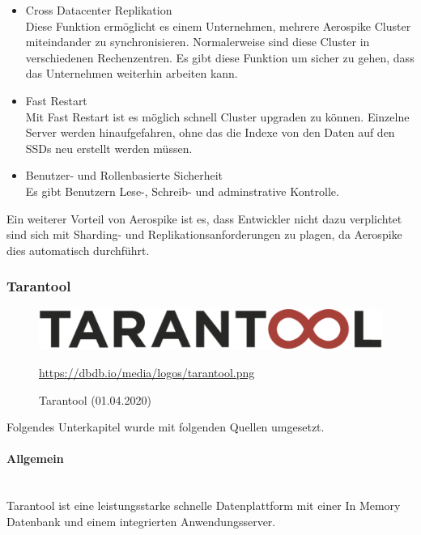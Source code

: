 \begin{itemize}
\item{Cross Datacenter Replikation} \mbox{} \\
Diese Funktion ermöglicht es einem Unternehmen, mehrere Aerospike Cluster miteindander zu synchronisieren. Normalerweise sind diese Cluster in verschiedenen Rechenzentren. Es gibt diese Funktion um sicher zu gehen, dass das Unternehmen weiterhin arbeiten kann.
\item{Fast Restart} \mbox{} \\
Mit Fast Restart ist es möglich schnell Cluster upgraden zu können. Einzelne Server werden hinaufgefahren, ohne das die Indexe von den Daten auf den SSDs neu erstellt werden müssen.
\item{Benutzer- und Rollenbasierte Sicherheit} \mbox{} \\
Es gibt Benutzern Lese-, Schreib- und adminstrative Kontrolle.
\end{itemize}
Ein weiterer Vorteil von Aerospike ist es, dass Entwickler nicht dazu verplichtet sind sich mit Sharding- und Replikationsanforderungen zu plagen, da Aerospike dies automatisch durchführt.
\newpage
\subsubsection{Tarantool}
\begin{figure}[H]
\centering
  \includegraphics[scale=0.3]{images/tarantool.png}
  \caption[Tarantool (01.04.2020)]{Tarantool (01.04.2020)}
  \label{fig:Tarantool}
  \url{https://dbdb.io/media/logos/tarantool.png}
\end{figure}
Folgendes Unterkapitel wurde mit folgenden Quellen umgesetzt. \cite{tarantool_tarantool_2020}
\paragraph{Allgemein}\mbox{} \\
Tarantool ist eine leistungsstarke schnelle Datenplattform mit einer In Memory Datenbank und einem integrierten Anwendungsserver. 

